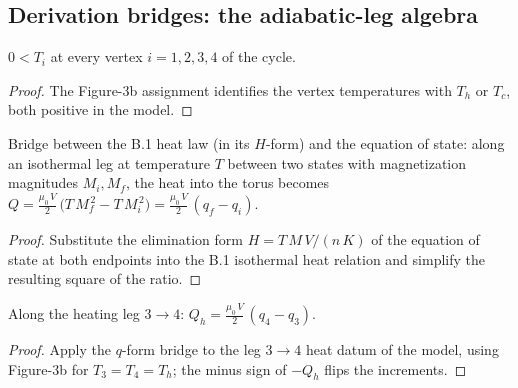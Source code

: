 \subsection*{Derivation bridges: the adiabatic-leg algebra}

\begin{lemma}
\label{lem:IPhO2026Problems_problem_IPhO_2026_3_C_2:vertex_T_pos}
$0 < T_i$ at every vertex $i = 1, 2, 3, 4$ of the cycle.
\end{lemma}
\begin{proof}
The Figure-3b assignment identifies the vertex temperatures with
$T_h$ or $T_c$, both positive in the model.
\end{proof}

\begin{lemma}
\label{lem:IPhO2026Problems_problem_IPhO_2026_3_C_2:heat_isothermal_via_q}
Bridge between the B.1 heat law (in its $H$-form) and the equation of
state: along an isothermal leg at temperature $T$ between two states
with magnetization magnitudes $M_i, M_f$, the heat into the torus
becomes
$Q = \frac{\mu_0\,V}{2}\,\bigl(T\,M_f^{\,2} - T\,M_i^{\,2}\bigr)
 = \frac{\mu_0\,V}{2}\,(q_f - q_i)$.
\end{lemma}
\begin{proof}
Substitute the elimination form $H = T\,M\,V/(n\,K)$ of the equation
of state at both endpoints into the B.1 isothermal heat relation and
simplify the resulting square of the ratio.
\end{proof}

\begin{lemma}
\label{lem:IPhO2026Problems_problem_IPhO_2026_3_C_2:Qh_eq}
Along the heating leg $3 \to 4$:
$Q_h = \frac{\mu_0\,V}{2}\,(q_4 - q_3)$.
\end{lemma}
\begin{proof}
Apply the $q$-form bridge to the leg $3 \to 4$ heat datum of the
model, using Figure-3b for $T_3 = T_4 = T_h$; the minus sign of
$-Q_h$ flips the increments.
\end{proof}


